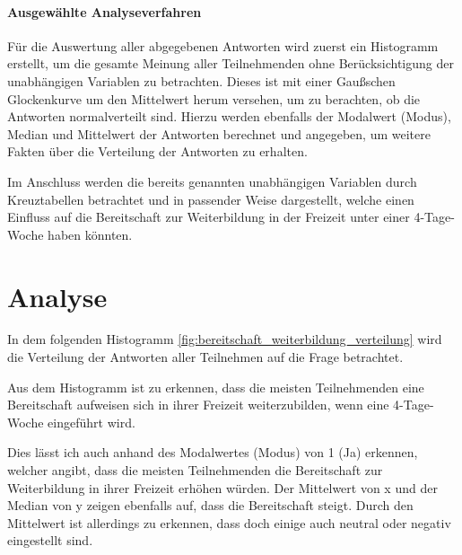 \paragraph*{Ausgewählte Analyseverfahren}

Für die Auswertung aller abgegebenen Antworten wird zuerst ein Histogramm erstellt, um die gesamte Meinung
aller Teilnehmenden ohne Berücksichtigung der unabhängigen Variablen zu betrachten. Dieses ist mit einer
Gaußschen Glockenkurve um den Mittelwert herum versehen, um zu berachten, ob die Antworten normalverteilt 
sind.
Hierzu werden ebenfalls der Modalwert (Modus), Median und Mittelwert der Antworten berechnet und angegeben,
um weitere Fakten über die Verteilung der Antworten zu erhalten. %

Im Anschluss werden die bereits genannten unabhängigen Variablen durch Kreuztabellen betrachtet und
in passender Weise dargestellt, 
welche einen Einfluss auf die Bereitschaft zur Weiterbildung in der Freizeit unter einer 4-Tage-Woche 
haben könnten. 




\section{Analyse}

In dem folgenden Histogramm \ref{fig:bereitschaft_weiterbildung_verteilung} wird die Verteilung 
der Antworten aller Teilnehmen auf die Frage  betrachtet. 

Aus dem Histogramm ist zu erkennen, dass die meisten Teilnehmenden eine Bereitschaft aufweisen
sich in ihrer Freizeit weiterzubilden, wenn eine 4-Tage-Woche eingeführt wird.

Dies lässt ich auch anhand des Modalwertes (Modus) von 1 (Ja) erkennen, welcher angibt, dass die
meisten Teilnehmenden die Bereitschaft zur Weiterbildung in ihrer Freizeit erhöhen würden.
Der Mittelwert von x und der Median von y zeigen ebenfalls auf, dass die Bereitschaft steigt.
Durch den Mittelwert ist allerdings zu erkennen, dass doch einige auch neutral oder negativ 
eingestellt sind.

